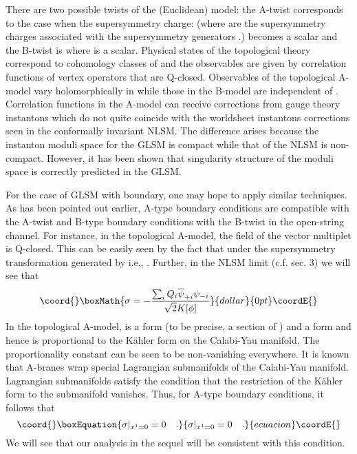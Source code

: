 \documentclass[a4paper,12pt]{article}
\begin{document}
There are two possible twists of the (Euclidean) \coordHE{} model: the A-twist 
corresponds to the case when the supersymmetry charge: \coordHE{}
(where \coordHE{} are the supersymmetry charges associated
with the supersymmetry generators \coordHE{}.)
becomes a scalar and the B-twist is where \coordHE{}
is a scalar. Physical states of the topological theory correspond
to cohomology classes of \coordHE{} and the observables are given by
correlation functions of vertex operators that are Q-closed.
Observables of the topological A-model vary holomorphically in
\coordHE{} while those in the B-model are independent
of \coordHE{}. Correlation functions in the A-model can receive corrections
from gauge theory instantons which do not quite coincide with
the worldsheet instantons corrections seen in the conformally
invariant NLSM. The difference arises because the instanton
moduli space for the GLSM  is compact while that of the NLSM is 
non-compact\cite{wittenphases}. 
However, it has been shown that singularity structure of the moduli
space is correctly predicted in the GLSM\cite{wittenphases,morple}.

For the case of GLSM with boundary, one may hope to apply similar
techniques. As has been pointed out earlier\cite{ooy},
A-type boundary conditions
are compatible with the A-twist and B-type boundary conditions with
the B-twist in the open-string channel. 
For instance, in the topological
A-model, the \myHighlight{$\sigma$}\coordHE{} field of the vector multiplet is Q-closed.
This can be easily seen by the fact that \coordHE{} under
the supersymmetry transformation generated by \coordHE{} i.e.,
\myHighlight{$\epsilon_+=\overline{\epsilon}_-$}\coordHE{}. Further, in the NLSM limit
(c.f. sec. 3) we will see that
$$\coord{}\boxMath{
\sigma = -{{\sum_i Q_i \overline{\psi}_{+i}\psi_{-i}}\over{\sqrt2
K[\phi]}} 
}{dollar}{0pt}\coordE{}$$
In the topological A-model, 
\coordHE{} is a \coordHE{} form 
(to be precise, a section of \coordHE{})
and \coordHE{} a \coordHE{} form and hence \myHighlight{$\sigma$}\coordHE{} is proportional
to the K\"ahler form \myHighlight{$\omega$}\coordHE{} on the Calabi-Yau manifold. The proportionality
constant \coordHE{} can be seen to be non-vanishing everywhere. It is known
that A-branes wrap special Lagrangian submanifolds of the Calabi-Yau 
manifold. Lagrangian submanifolds satisfy the condition that the restriction
of the K\"ahler form \myHighlight{$\omega$}\coordHE{} to the submanifold vanishes. Thus, 
for A-type boundary conditions, it follows that
\begin{equation}\coord{}\boxEquation{
\sigma|_{x^1=0} =0\quad.
}{
\sigma|_{x^1=0} =0\quad.
}{ecuacion}\coordE{}\end{equation}
We will see that our analysis in the sequel will be consistent 
with this condition. 
\end{document}
